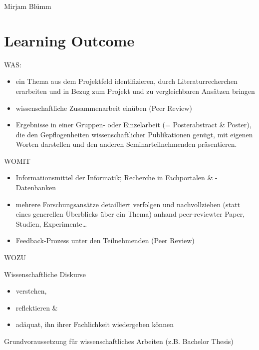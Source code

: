 Mirjam Blümm

\hypertarget{learning-outcomepathlabel....srcmodulbeschreibungen-bachelor-bpo5ba_advanced-seminar}{%
\section*{Learning
Outcome\label{../../src/modulbeschreibungen-bachelor-bpo5/BA_Advanced-Seminar}}\label{learning-outcomepathlabel....srcmodulbeschreibungen-bachelor-bpo5ba_advanced-seminar}}

WAS:

\begin{itemize}
\tightlist
\item
  ein Thema aus dem Projektfeld identifizieren, durch
  Literaturrecherchen erarbeiten und in Bezug zum Projekt und zu
  vergleichbaren Ansätzen bringen
\item
  wissenschaftliche Zusammenarbeit einüben (Peer Review)
\item
  Ergebnisse in einer Gruppen- oder Einzelarbeit (= Posterabstract \&
  Poster), die den Gepflogenheiten wissenschaftlicher Publikationen
  genügt, mit eigenen Worten darstellen und den anderen
  Seminarteilnehmenden präsentieren.
\end{itemize}

WOMIT

\begin{itemize}
\tightlist
\item
  Informationsmittel der Informatik; Recherche in Fachportalen \&
  -Datenbanken
\item
  mehrere Forschungsansätze detailliert verfolgen und nachvollziehen
  (statt eines generellen Überblicks über ein Thema) anhand
  peer-reviewter Paper, Studien, Experimente\ldots{}
\item
  Feedback-Prozess unter den Teilnehmenden (Peer Review)
\end{itemize}

WOZU

Wissenschaftliche Diskurse

\begin{itemize}
\tightlist
\item
  verstehen,
\item
  reflektieren \&
\item
  adäquat, ihn ihrer Fachlichkeit wiedergeben können
\end{itemize}

Grundvoraussetzung für wissenschaftliches Arbeiten (z.B. Bachelor
Thesis)

